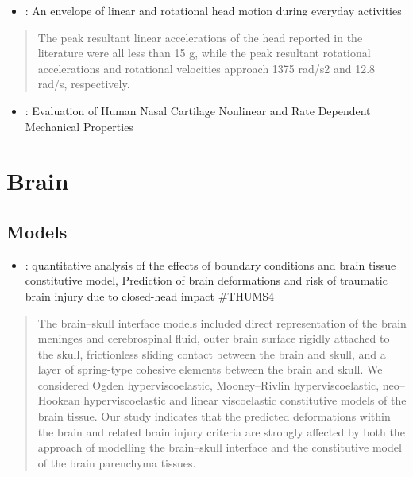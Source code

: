 \documentclass[]{book}
\providecommand{\tightlist}{%
  \setlength{\itemsep}{0pt}\setlength{\parskip}{0pt}}
\begin{document}
\begin{itemize}
\tightlist
\item
  \citet{Miller2019}: An envelope of linear and rotational head motion during everyday activities
\end{itemize}

\begin{quote}
The peak resultant linear accelerations of the head reported in the literature were all less than 15 g, while the peak resultant rotational accelerations and rotational velocities approach 1375 rad/s2 and 12.8 rad/s, respectively.
\end{quote}

\begin{itemize}
\tightlist
\item
  \citet{Chang2019}: Evaluation of Human Nasal Cartilage Nonlinear and Rate Dependent Mechanical Properties
\end{itemize}

\hypertarget{brain}{%
\section{Brain}\label{brain}}

\hypertarget{models}{%
\subsection{Models}\label{models}}

\begin{itemize}
\tightlist
\item
  \citet{Wang2018}: quantitative analysis of the effects of boundary conditions and brain tissue constitutive model, Prediction of brain deformations and risk of traumatic brain injury due to closed-head impact
  \#THUMS4
\end{itemize}

\begin{quote}
The brain--skull interface models included direct representation of the brain meninges and cerebrospinal fluid, outer brain surface rigidly attached to the skull, frictionless sliding contact between the brain and skull, and a layer of spring-type cohesive elements between the brain and skull. We considered Ogden hyperviscoelastic, Mooney--Rivlin hyperviscoelastic, neo--Hookean hyperviscoelastic and linear viscoelastic constitutive models of the brain tissue. Our study indicates that the predicted deformations within the brain and related brain injury criteria are strongly affected by both the approach of modelling the brain--skull interface and the constitutive model of the brain parenchyma tissues.
\end{quote}
\end{document}
